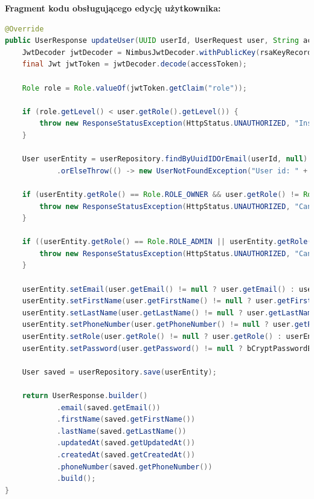 \textbf{Fragment kodu obsługującego edycję użytkownika:}
\begin{lstlisting}[language=Java, style=JavaStyle, caption=Edycja użytkownika w \texttt{UserServiceImp}]
@Override
public UserResponse updateUser(UUID userId, UserRequest user, String accessToken) throws UserNotFoundException {
    JwtDecoder jwtDecoder = NimbusJwtDecoder.withPublicKey(rsaKeyRecord.publicKey()).build();
    final Jwt jwtToken = jwtDecoder.decode(accessToken);

    Role role = Role.valueOf(jwtToken.getClaim("role"));

    if (role.getLevel() < user.getRole().getLevel()) {
        throw new ResponseStatusException(HttpStatus.UNAUTHORIZED, "Insufficient permissions to update or assign the role");
    }

    User userEntity = userRepository.findByUuidIDOrEmail(userId, null)
            .orElseThrow(() -> new UserNotFoundException("User id: " + userId + " not found"));

    if (userEntity.getRole() == Role.ROLE_OWNER && user.getRole() != Role.ROLE_OWNER) {
        throw new ResponseStatusException(HttpStatus.UNAUTHORIZED, "Cannot change the role of an OWNER");
    }

    if ((userEntity.getRole() == Role.ROLE_ADMIN || userEntity.getRole() == Role.ROLE_EMPLOYEE) && user.getRole() == Role.ROLE_OWNER) {
        throw new ResponseStatusException(HttpStatus.UNAUTHORIZED, "Cannot change the role to OWNER");
    }

    userEntity.setEmail(user.getEmail() != null ? user.getEmail() : userEntity.getEmail());
    userEntity.setFirstName(user.getFirstName() != null ? user.getFirstName() : userEntity.getFirstName());
    userEntity.setLastName(user.getLastName() != null ? user.getLastName() : userEntity.getLastName());
    userEntity.setPhoneNumber(user.getPhoneNumber() != null ? user.getPhoneNumber() : userEntity.getPhoneNumber());
    userEntity.setRole(user.getRole() != null ? user.getRole() : userEntity.getRole());
    userEntity.setPassword(user.getPassword() != null ? bCryptPasswordEncoder.encode(user.getPassword()) : userEntity.getPassword());

    User saved = userRepository.save(userEntity);

    return UserResponse.builder()
            .email(saved.getEmail())
            .firstName(saved.getFirstName())
            .lastName(saved.getLastName())
            .updatedAt(saved.getUpdatedAt())
            .createdAt(saved.getCreatedAt())
            .phoneNumber(saved.getPhoneNumber())
            .build();
}
\end{lstlisting}


